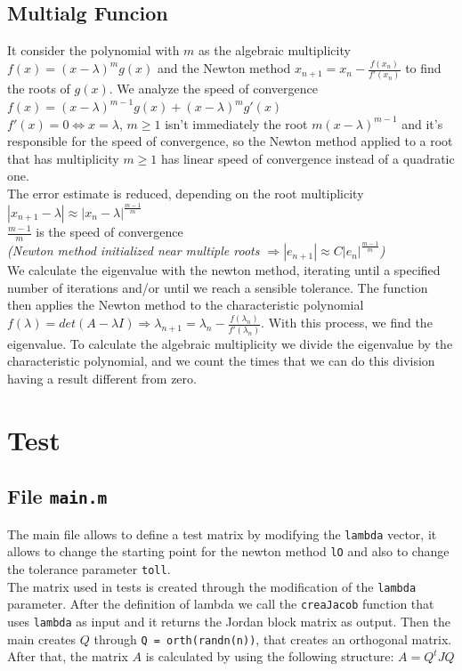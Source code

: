 \documentclass[12pt]{article}
\begin{document}
    \subsection{Multialg Funcion}
    It consider the polynomial with $m$ as the algebraic multiplicity $f(x)=(x-\lambda)^m g(x)$ and the Newton method $x_{n+1}=x_n - \frac{f(x_n)}{f'(x_n)}$ to find the roots of $g(x)$.
    We analyze the speed of convergence $f(x)=(x-\lambda)^{m-1} g(x) + (x-\lambda)^m g'(x)$\\
    $f'(x) = 0 \iff x = \lambda$, $m \geq 1$ isn't immediately the root $m(x-\lambda)^{m-1}$ and it's responsible for the speed of convergence, so the Newton method applied to a root that has multiplicity $m\geq 1$ has linear speed of convergence instead of a quadratic one.\\
    The error estimate is reduced, depending on the root multiplicity $|x_{n+1}-\lambda| \approx |x_n - \lambda|^{\frac{m-1}{m}}$\\
    $\frac{m-1}{m}$ is the speed of convergence\\ \textit{(Newton method initialized near multiple roots $\Rightarrow |e_{n+1}| \approx C|e_n|^{\frac{m-1}{m}}$)}\\
    We calculate the eigenvalue with the newton method, iterating until a specified number of iterations and/or until we reach a sensible tolerance. The function then applies the Newton method to the characteristic polynomial $f(\lambda) = det(A-\lambda I) \Rightarrow \lambda_{n+1} = \lambda_n - \frac{f(\lambda_n)}{f'(\lambda_n)}$. With this process, we find the eigenvalue.
    To calculate the algebraic multiplicity we divide the eigenvalue by the characteristic polynomial, and we count the times that we can do this division having a result different from zero.
    \section{Test}
    \subsection{File \texttt{main.m}}
    The main file allows to define a test matrix by modifying the \texttt{lambda} vector, it allows to change the starting point for the newton method \texttt{lO} and also to change the tolerance parameter \texttt{toll}.\\
    The matrix used in tests is created through the modification of the \texttt{lambda} parameter. After the definition of lambda we call the \texttt{creaJacob} function that uses \texttt{lambda} as input and it returns the Jordan block matrix as output. Then the main creates $Q$ through \texttt{Q = orth(randn(n))}, that creates an orthogonal matrix. After that, the matrix $A$ is calculated by using the following structure: $A=Q^tJQ$\\
    \newpage
\end{document}
